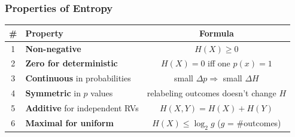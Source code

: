 \documentclass[aspectratio=169]{beamer}
\begin{document}
\begin{frame}
\frametitle{Properties of Entropy}

\renewcommand{\arraystretch}{1.35}
\begin{center}
\begin{tabular}{clc}
  \textbf{\#} & \textbf{Property} & \textbf{Formula} \\
  \hline
  1 & \textbf{Non-negative} & $H(X) \geq 0$ \\
  2 & \textbf{Zero for deterministic} & $H(X) = 0$ iff one $p(x) = 1$ \\
  3 & \textbf{Continuous} in probabilities & small $\Delta p \Rightarrow$ small $\Delta H$ \\
  4 & \textbf{Symmetric} in $p$ values & relabeling outcomes doesn't change $H$ \\
  5 & \textbf{Additive} for independent RVs & $H(X,Y) = H(X) + H(Y)$ \\
  6 & \textbf{Maximal for uniform} & $H(X) \leq \log_2 g$ \;($g$ = \#outcomes) \\
  \hline
\end{tabular}
\end{center}

\vspace{0.05cm}
\begin{center}
\end{center}
\end{frame}
\end{document}
